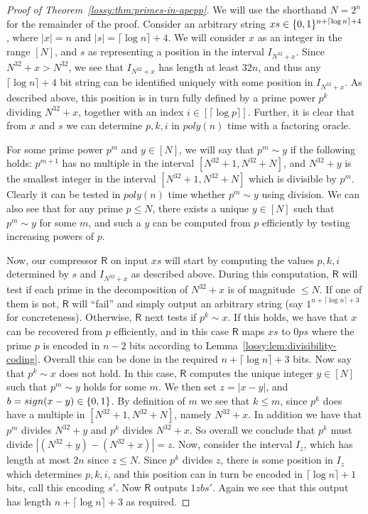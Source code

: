 \begin{proof}[Proof of Theorem~\ref{lossy:thm:primes-in-apepp}]
We will use the shorthand $N = 2^n$ for the remainder of the proof. Consider an arbitrary string $xs \in \{0,1\}^{n + \lceil \log n \rceil + 4}$, where $|x| = n$ and $|s| = \lceil\log n\rceil + 4$. We will consider $x$ as an integer in the range $[N]$, and $s$ as representing a position in the interval $I_{N^{32} + x}$. Since $N^{32} + x > N^{32}$, we see that $I_{N^{32}+x}$ has length at least $32n$, and thus any $\lceil \log n \rceil + 4$ bit string can be identified uniquely with some position in $I_{N^{32}+x}$. As described above, this position is in turn fully defined by a prime power $p^k$ dividing $N^{32} + x$, together with an index $i \in [\lceil \log p \rceil]$. Further, it is clear that from $x$ and $s$ we can determine $p,k,i$ in $poly(n)$ time with a factoring oracle.

For some prime power $p^m$ and $y \in [N]$, we will say that $p^m \sim y$ if the following holds: $p^{m+1}$ has no multiple in the interval $[N^{32}+1, N^{32}+N]$, and $N^{32}+y$ is the smallest integer in the interval $[N^{32}+1, N^{32}+N]$ which is divisible by $p^m$. Clearly it can be tested in $poly(n)$ time whether $p^m \sim y$ using division. We can also see that for any prime $p \leq N$, there exists a unique $y \in [N]$ such that $p^m \sim y$ for some $m$, and such a $y$ can be computed from $p$ efficiently by testing increasing powers of $p$.

Now, our compressor $\mathsf{R}$ on input $xs$ will start by computing the values $p,k,i$ determined by $s$ and $I_{N^{32}+x}$ as described above. During this computation, $\mathsf{R}$ will test if each prime in the decomposition of $N^{32} + x$ is of magnitude $\leq N$. If one of them is not, $\mathsf{R}$ will ``fail'' and simply output an arbitrary string (say $1^{n + \lceil \log n\rceil + 3}$ for concreteness). Otherwise, $\mathsf{R}$ next tests if $p^k \sim x$. If this holds, we have that $x$ can be recovered from $p$ efficiently, and in this case $\mathsf{R}$ maps $xs$ to $0ps$ where the prime $p$ is encoded in $n - 2$ bits according to Lemma~\ref{lossy:lem:divisibility-coding}. Overall this can be done in the required $n + \lceil \log n \rceil + 3$ bits. Now say that $p^k \sim x$ does not hold. In this case, $\mathsf{R}$ computes the unique integer $y \in [N]$ such that $p^m \sim y$ holds for some $m$. We then set $z = |x-y|$, and $b = sign(x-y) \in \{0,1\}$. By definition of $m$ we see that $k \leq m$, since $p^k$ does have a multiple in $[N^{32} + 1, N^{32} + N]$, namely $N^{32} + x$. In addition we have that $p^m$ divides $N^{32} +y$ and $p^k$ divides $N^{32} + x$. So overall we conclude that $p^k$ must divide $|(N^{32} + y) - (N^{32} + x)| = z$. Now, consider the interval $I_z$, which has length at most $2n$ since $z \leq N$. Since $p^k$ divides $z$, there is some position in $I_z$ which determines $p,k,i$, and this position can in turn be encoded in $\lceil \log n \rceil + 1$ bits, call this encoding $s'$. Now $\mathsf{R}$ outputs $1zbs'$. Again we see that this output has length $n + \lceil \log n \rceil + 3$ as required.


\end{proof}
